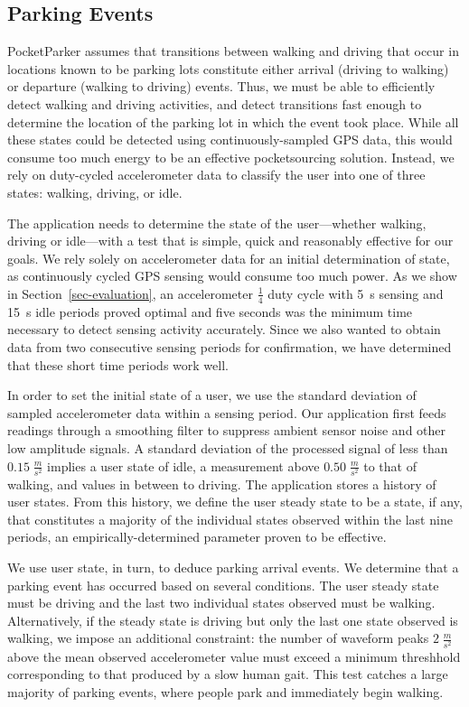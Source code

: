 \subsection{Parking Events}
\label{subsec-goals}

PocketParker assumes that transitions between walking and driving that occur
in locations known to be parking lots constitute either arrival (driving to
walking) or departure (walking to driving) events. Thus, we must be able to
efficiently detect walking and driving activities, and detect transitions
fast enough to determine the location of the parking lot in which the event
took place. While all these states could be detected using
continuously-sampled GPS data, this would consume too much energy to be an
effective pocketsourcing solution. Instead, we rely on duty-cycled
accelerometer data to classify the user into one of three states: walking,
driving, or idle.

The application needs to determine the state of the user---whether walking,
driving or idle---with a test that is simple, quick and reasonably effective
for our goals.  We rely solely on accelerometer data for an initial
determination of state, as continuously cycled GPS sensing would consume too
much power. As we show in Section~\ref{sec-evaluation}, an accelerometer
$\frac{1}{4}$ duty cycle with 5~s sensing and 15~s idle periods proved
optimal and five seconds was the minimum time necessary to detect sensing
activity accurately. Since we also wanted to obtain data from two consecutive
sensing periods for confirmation, we have determined that these short time
periods work well.

In order to set the initial state of a user, we use the standard deviation of
sampled accelerometer data within a sensing period. Our application first
feeds readings through a smoothing filter to suppress ambient sensor noise
and other low amplitude signals. A standard deviation of the processed signal
of less than $0.15\;\frac{m}{s^2}$ implies a user state of idle, a
measurement above $0.50\;\frac{m}{s^2}$ to that of walking, and values in
between to driving. The application stores a history of user states. From
this history, we define the user steady state to be a state, if any, that
constitutes a majority of the individual states observed within the last nine
periods, an empirically-determined parameter proven to be effective.

We use user state, in turn, to deduce parking arrival events. We determine
that a parking event has occurred based on several conditions. The user
steady state must be driving and the last two individual states observed must
be walking. Alternatively, if the steady state is driving but only the last
one state observed is walking, we impose an additional constraint: the number
of waveform peaks $2\;\frac{m}{s^2}$ above the mean observed accelerometer
value must exceed a minimum threshhold corresponding to that produced by a
slow human gait.  This test catches a large majority of parking events, where
people park and immediately begin walking.

